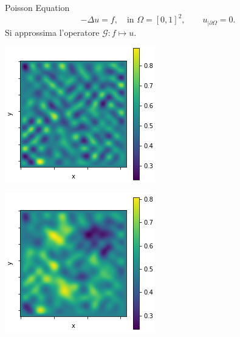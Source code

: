 \documentclass[aspectratio=169]{beamer}
\begin{document}
\begin{frame}[t]{Poisson Equation}
    \[
        -\Delta u = f, \quad \text{in } \Omega = [0, 1]^{2}, \quad\quad u_{| \partial \Omega} = 0.
    \]
    Si approssima l'operatore $\mathcal{G}: f\mapsto u$.
    \begin{center}
        \begin{minipage}{0.24\textwidth}
            \includegraphics[width=\textwidth]{operators/poisson/input.png}
        \end{minipage}
        \hfill
        \begin{minipage}{0.24\textwidth}
            \includegraphics[width=\textwidth]{operators/poisson/output.png}

\end{minipage}
\end{center}
\end{frame}
\end{document}
